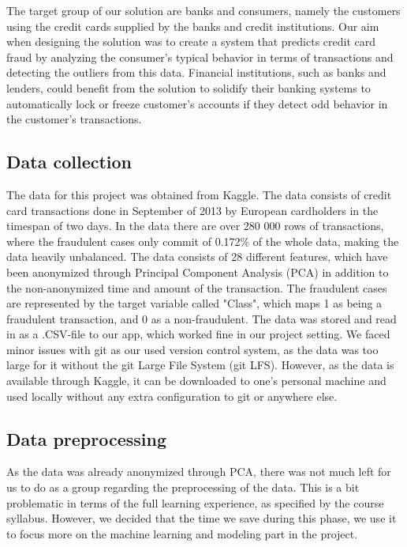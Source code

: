 \documentclass{article}
\begin{document}
The target group of our solution are banks and consumers, namely the customers using the credit cards supplied by the banks and credit institutions. Our aim when designing the solution was to create a system that predicts credit card fraud by analyzing the consumer's typical behavior in terms of transactions and detecting the outliers from this data. Financial institutions, such as banks and lenders, could benefit from the solution to solidify their banking systems to automatically lock or freeze customer's accounts if they detect odd behavior in the customer's transactions.

\subsection{Data collection}

The data for this project was obtained from Kaggle. The data consists of credit card transactions done in September of 2013 by European cardholders in the timespan of two days. In the data there are over 280 000 rows of transactions, where the fraudulent cases only commit of 0.172\% of the whole data, making the data heavily unbalanced. The data consists of 28 different features, which have been anonymized through Principal Component Analysis (PCA) in addition to the non-anonymized time and amount of the transaction. The fraudulent cases are represented by the target variable called "Class", which maps 1 as being a fraudulent transaction, and 0 as a non-fraudulent. The data was stored and read in as a .CSV-file to our app, which worked fine in our project setting. We faced minor issues with git as our used version control system, as the data was too large for it without the git Large File System (git LFS). However, as the data is available through Kaggle, it can be downloaded to one's personal machine and used locally without any extra configuration to git or anywhere else.

\subsection{Data preprocessing}

As the data was already anonymized through PCA, there was not much left for us to do as a group regarding the preprocessing of the data. This is a bit problematic in terms of the full learning experience, as specified by the course syllabus. However, we decided that the time we save during this phase, we use it to focus more on the machine learning and modeling part in the project.
\end{document}
